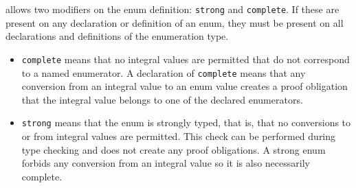 \NAME{} allows two modifiers on the enum definition: \lstinline|strong| and \lstinline|complete|. If these are present on any declaration or definition of an enum, they must be present on all declarations and definitions of the enumeration type.
\begin{itemize}
	\item \lstinline|complete| means that no integral values are permitted that do not correspond to a named enumerator. A declaration of \lstinline|complete| means that any conversion from an integral value to an enum value 
	creates a proof obligation that the integral value belongs to one of the declared enumerators.
	\item \lstinline|strong| means that the enum is strongly
	typed, that is, that no conversions to or from integral
	values are permitted. This check can be performed during
	type checking and does not create any proof obligations.
	A strong enum forbids any conversion from an integral value
	so it is also necessarily complete.
\end{itemize}
